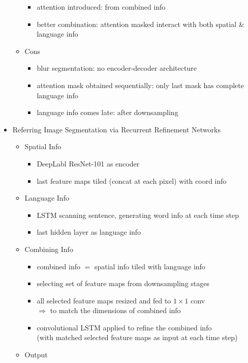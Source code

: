 \begin{itemize}
\begin{itemize}
		\begin{itemize}
		\item attention introduced: from combined info
		\item better combination: attention masked interact with both spatial \& language info
		\end{itemize}
	\item Cons
		\begin{itemize}
		\item blur segmentation: no encoder-decoder architecture
		\item attention mask obtained sequentially: only last mask has complete language info
		\item language info comes late: after downsampling
		\end{itemize}
	\end{itemize}
\item Referring Image Segmentation via Recurrent Refinement Networks
	\begin{itemize}
	\item Spatial Info
		\begin{itemize}
		\item DeepLabl ResNet-101 as encoder
		\item last feature maps tiled (concat at each pixel) with coord info
		\end{itemize}
	\item Language Info
		\begin{itemize}
		\item LSTM scanning sentence, generating word info at each time step
		\item last hidden layer as language info
		\end{itemize}
	\item Combining Info
		\begin{itemize}
		\item combined info $=$ spatial info tiled with language info
		\item selecting set of feature maps from downsampling stages
		\item all selected feature maps resized and fed to $1\times1$ conv \\ 
		$\Rightarrow$ to match the dimensions of combined info
		\item convolutional LSTM applied to refine the combined info \\ 
		(with matched selected feature maps as input at each time step)
		\end{itemize}
	\item Output

\end{itemize}
\end{itemize}
